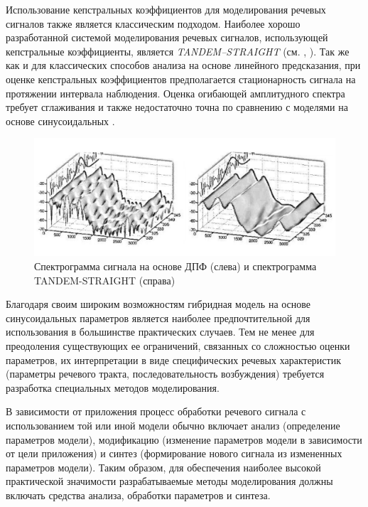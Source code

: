 Использование кепстральных коэффициентов для моделирования речевых сигналов также является классическим подходом. Наиболее хорошо разработанной системой моделирования речевых сигналов, использующей кепстральные коэффициенты, является \textit{TANDEM–STRAIGHT} (см. , ). Так же как и для классических способов анализа на основе линейного предсказания, при оценке кепстральных коэффициентов предполагается стационарность сигнала на протяжении интервала наблюдения. Оценка огибающей амплитудного спектра требует сглаживания и также недостаточно точна по сравнению с моделями на основе синусоидальных   \textit{}.

\begin{figure}[H]
    \centerline{
        \includegraphics[scale=1.0, width=1.0\textwidth]{author/part4/figures/ch43_fig06_straight-spectrum.png}
    }
    \caption{Спектрограмма сигнала на основе ДПФ (слева) и спектрограмма TANDEM-STRAIGHT (справа)}
    \label{fig:straight-spectrum}
\end{figure}


Благодаря своим широким возможностям гибридная модель на основе синусоидальных параметров является наиболее предпочтительной для использования в большинстве практических случаев. Тем не менее для преодоления существующих ее ограничений, связанных со сложностью оценки параметров, их интерпретации в виде специфических речевых характеристик (параметры речевого тракта, последовательность возбуждения) требуется разработка специальных методов моделирования. 

В зависимости от приложения процесс обработки речевого сигнала с использованием той или иной модели обычно включает анализ (определение параметров модели), модификацию (изменение параметров модели в зависимости от цели приложения) и синтез (формирование нового сигнала из измененных параметров модели). Таким образом, для обеспечения наиболее высокой практической значимости разрабатываемые методы моделирования должны включать средства анализа, обработки параметров и синтеза.

